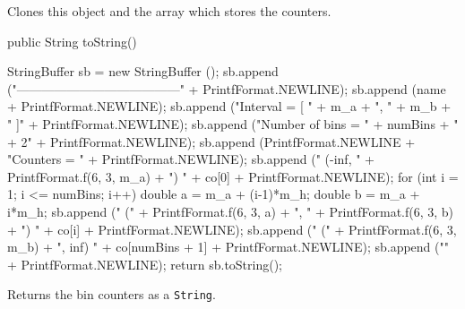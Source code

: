 \begin{tabb} Clones this object and the array which stores the counters.
\end{tabb}
\begin{code}

   public String toString()\begin{hide} {
      StringBuffer sb = new StringBuffer ();
      sb.append ("---------------------------------------" + 
                PrintfFormat.NEWLINE);
      sb.append (name + PrintfFormat.NEWLINE);
      sb.append ("Interval = [ " + m_a + ", " + m_b + " ]" +
                 PrintfFormat.NEWLINE);
      sb.append ("Number of bins = " + numBins + " + 2" + PrintfFormat.NEWLINE);
      sb.append (PrintfFormat.NEWLINE + "Counters = {" +
                 PrintfFormat.NEWLINE);
      sb.append ("   (-inf, " + PrintfFormat.f(6, 3, m_a)
                 + ")    " + co[0] + PrintfFormat.NEWLINE);
      for (int i = 1; i <= numBins; i++) {
         double a = m_a + (i-1)*m_h; 
         double b = m_a + i*m_h; 
         sb.append ("   (" +
            PrintfFormat.f(6, 3, a) + ", " +
            PrintfFormat.f(6, 3, b) + ")    " + co[i] +
                 PrintfFormat.NEWLINE);
      }
      sb.append ("   (" + PrintfFormat.f(6, 3, m_b)
                 + ", inf)    " + co[numBins + 1] +
                 PrintfFormat.NEWLINE);
      sb.append ("}" + PrintfFormat.NEWLINE);
      return sb.toString();
   }\end{hide}
\end{code}
\begin{tabb} Returns the bin counters as a \texttt{String}.
\end{tabb}
\begin{code}\begin{hide}
}\end{hide}
\end{code}
